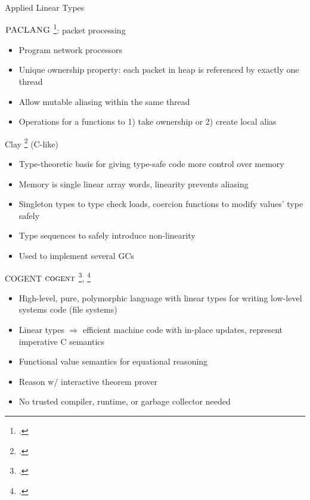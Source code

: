 \documentclass[aspectratio=169]{beamer}
\begin{document}
\begin{frame}{Applied Linear Types}
\footnotesize{
$\textsc{PACLANG}$ \footcite{ennals_linear_2004}: packet processing
  \begin{itemize}
    \item Program network processors %
    \item Unique ownership property: each packet in heap is referenced by exactly one thread
    \item Allow mutable aliasing within the same thread
    \item Operations for a functions to 1) take ownership or 2) create local alias
  \end{itemize}
Clay \footcite{hawblitzel_low-level_2004} (C-like) 
  \begin{itemize}
    \item Type-theoretic basis for giving type-safe code more control over memory
    \item Memory is single linear array words, linearity prevents aliasing
    \item Singleton types to type check loads, coercion functions to modify values' type safely
    \item Type sequences to safely introduce non-linearity %
    \item Used to implement several GCs
  \end{itemize}
}
\end{frame}

\begin{frame}{COGENT}
$\textsc{cogent}$ \footcite{amani_cogent:_2016}, \footcite{oconnor_cogent:_2016}
    \begin{itemize}
        \item High-level, pure, polymorphic language with linear types for writing low-level systems code (file systems)
        \item Linear types $\Rightarrow$ efficient machine code with in-place updates, represent imperative C semantics
        \item Functional value semantics for equational reasoning
        \item Reason w/ interactive theorem prover
        \item No trusted compiler, runtime, or garbage collector needed
    \end{itemize}
\end{frame}
\end{document}

